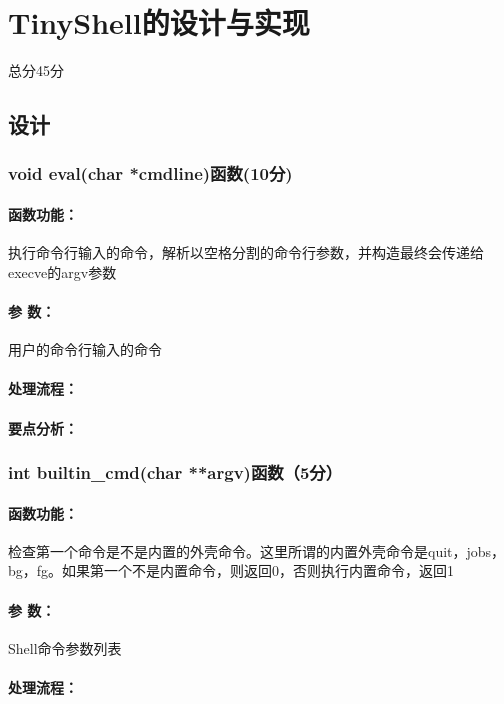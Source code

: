 \section{TinyShell的设计与实现}
\begin{center}
    总分45分
\end{center}

\subsection{设计}

\subsubsection{void eval(char *cmdline)函数(10分)}

\paragraph{函数功能：}执行命令行输入的命令，解析以空格分割的命令行参数，并构造最终会传递给execve的argv参数
\paragraph{参   数：}用户的命令行输入的命令
\paragraph{处理流程：}
\paragraph{要点分析：}

\subsubsection{int builtin\_cmd(char **argv)函数（5分）}

\paragraph{函数功能：}检查第一个命令是不是内置的外壳命令。这里所谓的内置外壳命令是quit，jobs，bg，fg。如果第一个不是内置命令，则返回0，否则执行内置命令，返回1
\paragraph{参   数：}Shell命令参数列表
\paragraph{处理流程：}
